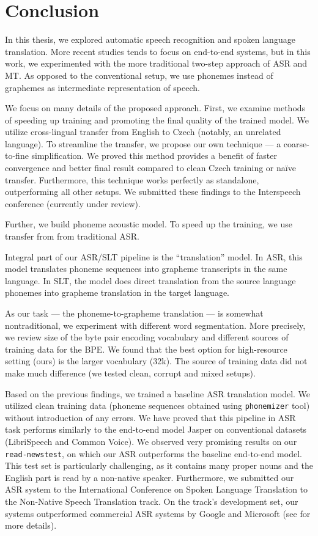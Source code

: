 \chapter*{Conclusion}
\label{chap:conclusion}

In this thesis, we explored automatic speech recognition and spoken language translation. More recent studies tends to focus on end-to-end systems, but in this work, we experimented with the more traditional two-step approach of ASR and MT. As opposed to the conventional setup, we use phonemes instead of graphemes as intermediate representation of speech.

We focus on many details of the proposed approach. First, we examine methods of speeding up training and promoting the final quality of the trained model. We utilize cross-lingual transfer from English to Czech (notably, an unrelated language). To streamline the transfer, we propose our own technique --- a coarse-to-fine simplification. We proved this method provides a benefit of faster convergence and better final result compared to clean Czech training or na\"ive transfer. Furthermore, this technique works perfectly as standalone, outperforming all other setups. We submitted these findings to the Interspeech conference (currently under review).

Further, we build phoneme acoustic model. To speed up the training, we use transfer from from traditional ASR.

Integral part of our ASR/SLT pipeline is the ``translation'' model. In ASR, this model translates phoneme sequences into grapheme transcripts in the same language. In SLT, the model does direct translation from the source language phonemes into grapheme translation in the target language. 

As our task --- the phoneme-to-grapheme translation --- is somewhat nontraditional, we experiment with different word segmentation. More precisely, we review size of the byte pair encoding vocabulary and different sources of training data for the BPE. We found that the best option for high-resource setting (ours) is the larger vocabulary (32k). The source of training data did not make much difference (we tested clean, corrupt and mixed setups).

Based on the previous findings, we trained a baseline ASR translation model. We utilized clean training data (phoneme sequences obtained using \texttt{phonemizer} tool) without introduction of any errors. We have proved that this pipeline in ASR task performs similarly to the end-to-end model Jasper on conventional datasets (LibriSpeech and Common Voice). We observed very promising results on our \texttt{read-newstest}, on which our ASR outperforms the baseline end-to-end model. This test set is particularly challenging, as it contains many proper nouns and the English part is read by a non-native speaker. Furthermore, we submitted our ASR system to the International Conference on Spoken Language Translation to the Non-Native Speech Translation track. On the track's development set, our systems outperformed commercial ASR systems by Google and Microsoft (see  for more details).

